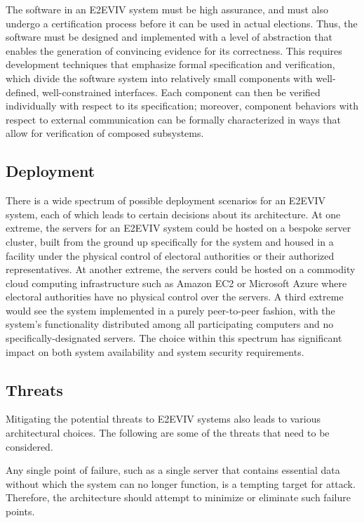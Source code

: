 The software in an E2EVIV system must be high assurance, and must also
undergo a certification process before it can be used in actual
elections. Thus, the software must be designed and implemented with a
level of abstraction that enables the generation of convincing
evidence for its correctness. This requires development techniques
that emphasize formal specification and verification, which divide the
software system into relatively small components with well-defined,
well-constrained interfaces. Each component can then be verified
individually with respect to its specification; moreover, component
behaviors with respect to external communication can be formally
characterized in ways that allow for verification of composed
subsystems.

\subsection{Deployment}

There is a wide spectrum of possible deployment scenarios for an
E2EVIV system, each of which leads to certain decisions about its
architecture. At one extreme, the servers for an E2EVIV system could
be hosted on a bespoke server cluster, built from the ground up
specifically for the system and housed in a facility under the
physical control of electoral authorities or their authorized
representatives. At another extreme, the servers could be hosted on a
commodity cloud computing infrastructure such as Amazon EC2 or
Microsoft Azure where electoral authorities have no physical control
over the servers. A third extreme would see the system implemented in
a purely peer-to-peer fashion, with the system's functionality
distributed among all participating computers and no
specifically-designated servers. The choice within this spectrum has
significant impact on both system availability and system security
requirements.


\subsection{Threats}

Mitigating the potential threats to E2EVIV systems also leads to
various architectural choices. The following are some of the threats
that need to be considered. 

Any single point of failure, such as a single server that contains
essential data without which the system can no longer function, is a
tempting target for attack. Therefore, the architecture should attempt
to minimize or eliminate such failure points.

